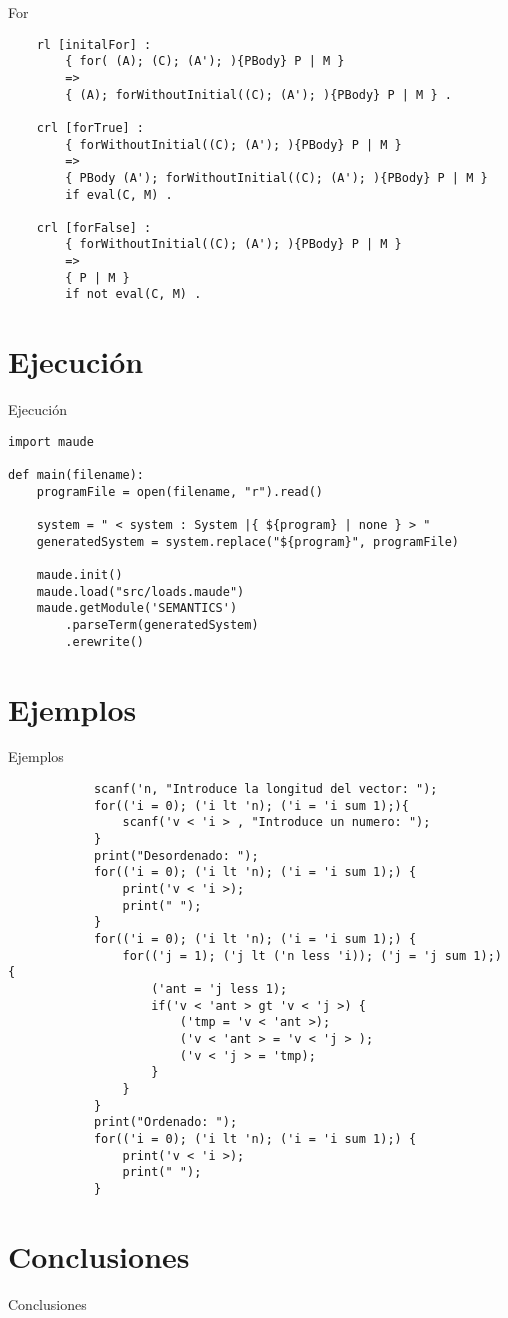 \documentclass{beamer}
\begin{document}
    \begin{frame}[fragile]{For}
        \begin{verbatim}  
    rl [initalFor] :
        { for( (A); (C); (A'); ){PBody} P | M }
        =>
        { (A); forWithoutInitial((C); (A'); ){PBody} P | M } .
    
    crl [forTrue] :
        { forWithoutInitial((C); (A'); ){PBody} P | M }
        =>
        { PBody (A'); forWithoutInitial((C); (A'); ){PBody} P | M }
        if eval(C, M) .
    
    crl [forFalse] :
        { forWithoutInitial((C); (A'); ){PBody} P | M }
        =>
        { P | M }
        if not eval(C, M) .
        \end{verbatim}
    \end{frame}

    \section{Ejecución}
    \begin{frame}[fragile]{Ejecución}
        \begin{verbatim}  
import maude
     
def main(filename):
    programFile = open(filename, "r").read()
            
    system = " < system : System |{ ${program} | none } > "
    generatedSystem = system.replace("${program}", programFile)
            
    maude.init()
    maude.load("src/loads.maude")
    maude.getModule('SEMANTICS')
        .parseTerm(generatedSystem)
        .erewrite()
        \end{verbatim}
    \end{frame}
    
    \section{Ejemplos}
    \begin{frame}[fragile]{Ejemplos}
        \begin{verbatim}  
            scanf('n, "Introduce la longitud del vector: ");
            for(('i = 0); ('i lt 'n); ('i = 'i sum 1);){
                scanf('v < 'i > , "Introduce un numero: ");
            }
            print("Desordenado: ");
            for(('i = 0); ('i lt 'n); ('i = 'i sum 1);) {
                print('v < 'i >);
                print(" ");
            }
            for(('i = 0); ('i lt 'n); ('i = 'i sum 1);) {
                for(('j = 1); ('j lt ('n less 'i)); ('j = 'j sum 1);) {
                    ('ant = 'j less 1);
                    if('v < 'ant > gt 'v < 'j >) {
                        ('tmp = 'v < 'ant >);
                        ('v < 'ant > = 'v < 'j > );
                        ('v < 'j > = 'tmp);
                    }
                }
            }
            print("Ordenado: ");
            for(('i = 0); ('i lt 'n); ('i = 'i sum 1);) {
                print('v < 'i >);
                print(" ");
            }
        \end{verbatim}
    \end{frame}

    \section{Conclusiones}
    \begin{frame}{Conclusiones}
    \end{frame}
\end{document}
